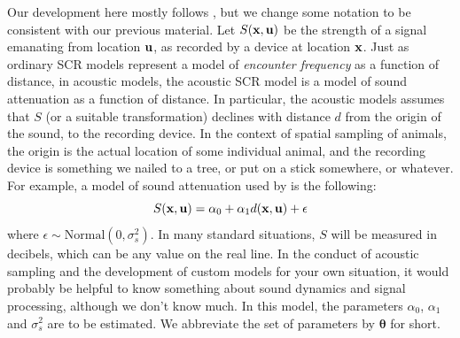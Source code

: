 Our  development here mostly follows \citet{efford_etal:2009ecol}, but
we change some notation to be consistent with our previous material.
Let $S({\bf x}, {\bf u})$ be  the strength of a signal emanating from
location ${\bf u}$, as recorded by a device at location ${\bf x}$. 
Just as ordinary SCR models represent a model of {\it encounter frequency} as a
function of distance, in acoustic models,  the acoustic SCR model is a model of sound
attenuation as a function of distance.
In particular, the acoustic models 
assumes that $S$ (or a suitable transformation) declines with distance
$d$ from the origin of the sound, to the recording device. In the
context of spatial sampling of animals, the origin is the actual
location of some individual animal, and the recording device is
something we nailed to a tree, or put on a stick somewhere, or whatever.
For example, a model of sound attenuation used by
\citet{dawson_efford:2009} is the following:
\begin{equation}
S({\bf x},{\bf u})  = \alpha_{0} + \alpha_{1} d({\bf x},{\bf u}) + \epsilon
\label{poisson-mn.eq.signal}
\end{equation}
where $\epsilon \sim \mbox{Normal}(0, \sigma_{s}^{2})$. In many standard
situations, $S$ will be measured in decibels, which can be any value
on the real line.  In the conduct of acoustic sampling and the
development of custom models for your own situation, it would probably
be helpful to know something about sound dynamics and signal
processing, although we don't know much.  In this model, the 
parameters $\alpha_0$, $\alpha_1$ and $\sigma_{s}^{2}$ are to be
estimated. We abbreviate the set of parameters by $\bm \theta$ for short.

